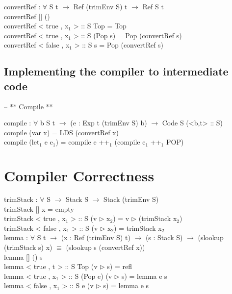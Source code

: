 \documentclass[paper=a4, fontsize=11pt]{scrartcl} %
\numberwithin{equation}{section} %
\numberwithin{figure}{section} %
\numberwithin{table}{section} %
\begin{document}
convertRef : $\forall$ {S t} $\rightarrow$ Ref (trimEnv S) t $\rightarrow$ Ref S t\\
convertRef {[]} ()\\
convertRef {< true , x$_1$ > :: S} Top = Top\\
convertRef {< true , x$_1$ > :: S} (Pop s) = Pop (convertRef s)\\
convertRef {< false , x$_1$ > :: S} s = Pop (convertRef s)\\
\normalfont

\subsection{Implementing the compiler to intermediate code}
\ttfamily
-- ** Compile ** 

compile : $\forall$ {b S t} $\rightarrow$ (e : Exp t (trimEnv S) b) $\rightarrow$ Code S (<b,t> :: S)\\
compile (var x) = LDS (convertRef x)\\
compile (let$_1$ e e$_1$) = compile e ++$_1$ (compile e$_1$ ++$_1$ POP)\\
\normalfont

\section{Compiler Correctness}
\ttfamily
trimStack : $\forall$ {S} $\rightarrow$ Stack S $\rightarrow$ Stack (trimEnv S)\\
trimStack {[]} x = empty\\
trimStack {< true , x$_1$ > :: S} (v $\rhd$ x$_2$) = v $\rhd$ (trimStack x$_2$)\\
trimStack {< false , x$_1$ > :: S} (v $\rhd$ x$_2$) = trimStack x$_2$\\


lemma : $\forall$ {S t} $\rightarrow$ (x : Ref (trimEnv S) t) $\rightarrow$ (s : Stack S) $\rightarrow$ (slookup (trimStack s) x) $\equiv$ (slookup s (convertRef x))\\
lemma {[]} () s\\
lemma {< true , t > :: S} Top (v $\rhd$ s) = refl\\
lemma {< true , x$_1$ > :: S} (Pop e) (v $\rhd$ s) = lemma e s\\
lemma {< false , x$_1$ > :: S} e (v $\rhd$ s) = lemma e s\\
\end{document}
